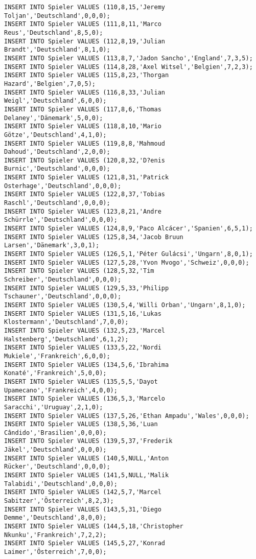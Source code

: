 \documentclass{bschlangaul-aufgabe}
\begin{document}
\begin{verbatim}
INSERT INTO Spieler VALUES (110,8,15,'Jeremy Toljan','Deutschland',0,0,0);
INSERT INTO Spieler VALUES (111,8,11,'Marco Reus','Deutschland',8,5,0);
INSERT INTO Spieler VALUES (112,8,19,'Julian Brandt','Deutschland',8,1,0);
INSERT INTO Spieler VALUES (113,8,7,'Jadon Sancho','England',7,3,5);
INSERT INTO Spieler VALUES (114,8,28,'Axel Witsel','Belgien',7,2,3);
INSERT INTO Spieler VALUES (115,8,23,'Thorgan Hazard','Belgien',7,0,5);
INSERT INTO Spieler VALUES (116,8,33,'Julian Weigl','Deutschland',6,0,0);
INSERT INTO Spieler VALUES (117,8,6,'Thomas Delaney','Dänemark',5,0,0);
INSERT INTO Spieler VALUES (118,8,10,'Mario Götze','Deutschland',4,1,0);
INSERT INTO Spieler VALUES (119,8,8,'Mahmoud Dahoud','Deutschland',2,0,0);
INSERT INTO Spieler VALUES (120,8,32,'D?enis Burnic','Deutschland',0,0,0);
INSERT INTO Spieler VALUES (121,8,31,'Patrick Osterhage','Deutschland',0,0,0);
INSERT INTO Spieler VALUES (122,8,37,'Tobias Raschl','Deutschland',0,0,0);
INSERT INTO Spieler VALUES (123,8,21,'Andre Schürrle','Deutschland',0,0,0);
INSERT INTO Spieler VALUES (124,8,9,'Paco Alcácer','Spanien',6,5,1);
INSERT INTO Spieler VALUES (125,8,34,'Jacob Bruun Larsen','Dänemark',3,0,1);
INSERT INTO Spieler VALUES (126,5,1,'Péter Gulácsi','Ungarn',8,0,1);
INSERT INTO Spieler VALUES (127,5,28,'Yvon Mvogo','Schweiz',0,0,0);
INSERT INTO Spieler VALUES (128,5,32,'Tim Schreiber','Deutschland',0,0,0);
INSERT INTO Spieler VALUES (129,5,33,'Philipp Tschauner','Deutschland',0,0,0);
INSERT INTO Spieler VALUES (130,5,4,'Willi Orban','Ungarn',8,1,0);
INSERT INTO Spieler VALUES (131,5,16,'Lukas Klostermann','Deutschland',7,0,0);
INSERT INTO Spieler VALUES (132,5,23,'Marcel Halstenberg','Deutschland',6,1,2);
INSERT INTO Spieler VALUES (133,5,22,'Nordi Mukiele','Frankreich',6,0,0);
INSERT INTO Spieler VALUES (134,5,6,'Ibrahima Konaté','Frankreich',5,0,0);
INSERT INTO Spieler VALUES (135,5,5,'Dayot Upamecano','Frankreich',4,0,0);
INSERT INTO Spieler VALUES (136,5,3,'Marcelo Saracchi','Uruguay',2,1,0);
INSERT INTO Spieler VALUES (137,5,26,'Ethan Ampadu','Wales',0,0,0);
INSERT INTO Spieler VALUES (138,5,36,'Luan Cândido','Brasilien',0,0,0);
INSERT INTO Spieler VALUES (139,5,37,'Frederik Jäkel','Deutschland',0,0,0);
INSERT INTO Spieler VALUES (140,5,NULL,'Anton Rücker','Deutschland',0,0,0);
INSERT INTO Spieler VALUES (141,5,NULL,'Malik Talabidi','Deutschland',0,0,0);
INSERT INTO Spieler VALUES (142,5,7,'Marcel Sabitzer','Österreich',8,2,3);
INSERT INTO Spieler VALUES (143,5,31,'Diego Demme','Deutschland',8,0,0);
INSERT INTO Spieler VALUES (144,5,18,'Christopher Nkunku','Frankreich',7,2,2);
INSERT INTO Spieler VALUES (145,5,27,'Konrad Laimer','Österreich',7,0,0);

\end{verbatim}
\end{document}
